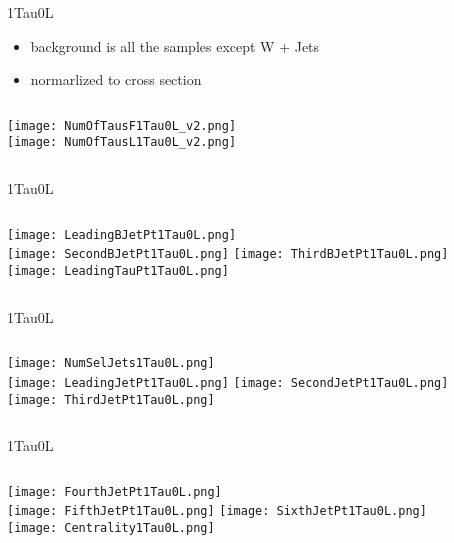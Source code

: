 \documentclass{beamer}
\begin{document}
\begin{frame}{1Tau0L}
    \begin{itemize}
    \item
        background is all the samples except W + Jets
    \item
        normarlized to cross section
    \end{itemize}
    \begin{columns}[t]
    \centering
    \texttt{[image: NumOfTausF1Tau0L\_v2.png]}\\
    \centering
    \texttt{[image: NumOfTausL1Tau0L\_v2.png]}
    \end{columns}
\end{frame}
\begin{frame}{1Tau0L}
    \begin{columns}[t]
    \centering
    \texttt{[image: LeadingBJetPt1Tau0L.png]}\\
    \texttt{[image: SecondBJetPt1Tau0L.png]}
    \centering
    \texttt{[image: ThirdBJetPt1Tau0L.png]}\\
    \texttt{[image: LeadingTauPt1Tau0L.png]}
    \end{columns}
\end{frame}
\begin{frame}{1Tau0L}
    \begin{columns}[t]
    \centering
    \texttt{[image: NumSelJets1Tau0L.png]}\\
    \texttt{[image: LeadingJetPt1Tau0L.png]}
    \centering
    \texttt{[image: SecondJetPt1Tau0L.png]}\\
    \texttt{[image: ThirdJetPt1Tau0L.png]}
    \end{columns}
\end{frame}
\begin{frame}{1Tau0L}
    \begin{columns}[t]
    \centering
    \texttt{[image: FourthJetPt1Tau0L.png]}\\
    \texttt{[image: FifthJetPt1Tau0L.png]}
    \centering
    \texttt{[image: SixthJetPt1Tau0L.png]}\\
    \texttt{[image: Centrality1Tau0L.png]}
    \end{columns}
\end{frame}
\end{document}
